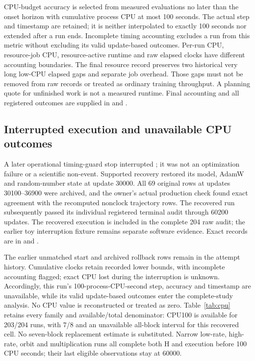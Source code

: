 CPU-budget accuracy is selected from measured evaluations no later than the onset horizon with cumulative process CPU at most 100 seconds. The actual step and timestamp are retained; it is neither interpolated to exactly 100 seconds nor extended after a run ends. Incomplete timing accounting excludes a run from this metric without excluding its valid update-based outcomes. Per-run CPU, resource-job CPU, resource-active runtime and raw elapsed clocks have different accounting boundaries. The final resource record preserves two historical very long low-CPU elapsed gaps and separate job overhead. Those gaps must not be removed from raw records or treated as ordinary training throughput. A planning quote for unfinished work is not a measured runtime. Final accounting and all registered outcomes are supplied in  and .


\clearpage
\subsection{Interrupted execution and unavailable CPU outcomes}
\label{app:recovery}
A later operational timing-guard stop interrupted ; it was not an optimization failure or a scientific non-event. Supported recovery restored its model, AdamW and random-number state at update 30000. All 69 original rows at updates 30100--36900 were archived, and the owner's actual production check found exact agreement with the recomputed nonclock trajectory rows. The recovered run subsequently passed its individual registered terminal audit through 60200 updates. The recovered execution is included in the complete 204 raw audit; the earlier toy interruption fixture remains separate software evidence. Exact records are in  and .

The earlier unmatched start and archived rollback rows remain in the attempt history. Cumulative clocks retain recorded lower bounds, with incomplete accounting flagged; exact CPU lost during the interruption is unknown. Accordingly, this run's 100-process-CPU-second step, accuracy and timestamp are unavailable, while its valid update-based outcomes enter the complete-study analysis. No CPU value is reconstructed or treated as zero. Table~\ref{tab:cpu} retains every family and available/total denominator: CPU100 is available for 203/204 runs, with 7/8 and an unavailable all-block interval for this recovered cell. No seven-block replacement estimate is substituted. Narrow low-rate, high-rate, orbit and multiplication runs all complete both H and execution before 100 CPU seconds; their last eligible observations stay at 60000.


